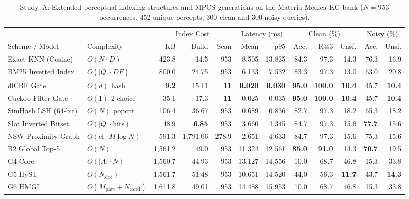 \documentclass[12pt,a4paper,oneside]{report}
\begin{document}
\begin{table}[H]
\centering
\caption{Study~A: Extended perceptual indexing structures and MPCS generations on the Materia Medica KG bank ($N=953$ occurrences, 452 unique percepts, 300 clean and 300 noisy queries).}
\label{tab:mmkg-indexing}
\scriptsize
\setlength{\tabcolsep}{1.9pt}
\begin{tabular}{@{}ll rrr rr rrr rr@{}}
\toprule
& & \multicolumn{3}{c}{Index Cost} & \multicolumn{2}{c}{Latency (ms)} & \multicolumn{3}{c}{Clean (\%)} & \multicolumn{2}{c}{Noisy (\%)}\\
\cmidrule(lr){3-5}\cmidrule(lr){6-7}\cmidrule(lr){8-10}\cmidrule(l){11-12}
Scheme / Model & Complexity & KB & Build & Scan & Mean & p95 & Acc. & R@3 & Unsf. & Acc. & Unsf.\\
\midrule
Exact KNN (Cosine) & $O(N{\cdot}D)$ & 423.8 & 14.5 & 953 & 8.505 & 13.835 & 84.3 & 97.3 & 14.3 & 76.3 & 16.9\\
BM25 Inverted Index & $O(|Q|{\cdot}\overline{DF})$ & 800.0 & 24.75 & 953 & 6.133 & 7.532 & 83.3 & 97.3 & 13.0 & 63.0 & 20.8\\
dlCBF Gate & $O(d)$ hash & \textbf{9.2} & 15.11 & \textbf{11} & \textbf{0.020} & \textbf{0.030} & \textbf{95.0} & \textbf{100.0} & \textbf{10.4} & 45.7 & \textbf{10.4}\\
Cuckoo Filter Gate & $O(1)$ 2-choice & 35.1 & 17.3 & \textbf{11} & 0.025 & 0.035 & \textbf{95.0} & \textbf{100.0} & \textbf{10.4} & 45.7 & \textbf{10.4}\\
SimHash LSH (64-bit) & $O(N)$ popcnt & 106.4 & 36.67 & 953 & 0.689 & 0.836 & 82.7 & 97.3 & 18.2 & 65.3 & 18.2\\
Slot Inverted Bitset & $O(|Q|{\cdot}\text{hits})$ & 48.9 & \textbf{6.85} & 953 & 3.660 & 4.345 & 84.7 & 97.3 & 15.6 & \textbf{77.7} & 15.6\\
NSW Proximity Graph & $O(\text{ef}{\cdot}M\log N)$ & 591.3 & 1{,}791.06 & 278.9 & 2.651 & 4.633 & 84.7 & 97.3 & 15.6 & 75.3 & 15.6\\
\midrule
B2 Global Top-5 & $O(N)$ & 1{,}561.2 & 49.0 & 953 & 11.324 & 12.561 & \textbf{85.0} & \textbf{91.0} & 14.3 & \textbf{70.7} & 19.5\\
G4 Core & $O(|A|{\cdot}N)$ & 1{,}560.7 & 44.93 & 953 & 13.127 & 14.556 & 10.0 & 68.7 & 46.8 & 15.3 & 33.8\\
G5 HyST & $O(N_{\text{slot}})$ & 1{,}561.7 & 51.48 & 953 & 10.651 & 14.520 & 44.0 & 56.3 & \textbf{11.7} & 43.7 & \textbf{14.3}\\
G6 HMGI & $O(M_{\text{part}}{+}N_{\text{cand}})$ & 1{,}611.8 & 49.01 & 953 & 14.488 & 15.953 & 10.0 & 68.7 & 46.8 & 15.3 & 33.8\\

\end{tabular}
\end{table}
\end{document}
